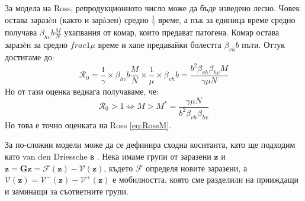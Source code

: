 За модела на Ross, репродукционното число може да бъде изведено лесно.
Човек остава заразèн (както и зарàзен) средно $\frac{1}{\gamma}$ време, а пък за единица време средно получава $\beta_{hv} b \frac{M}{N}$ ухапвания от комар, които предават патогена.
Комар остава заразèн за средно $frac{1}{\mu}$ време и хапе предавайки болестта $\beta_{vh} b$ пъти.
Оттук достигаме до:
\begin{equation}
  \mathscr{R}_0 = \frac{1}{\gamma} \times \beta_{hv} b \frac{M}{N} \times \frac{1}{\mu} \times \beta_{vh} b = \frac{b^2 \beta_{vh} \beta_{hv} M}{\gamma \mu N}
\end{equation}
Но от тази оценка веднага получаваме, че:
\begin{equation}
  \mathscr{R}_0 > 1 \iff M > M^* = \frac{\gamma \mu N}{b^2 \beta_{vh} \beta_{hv}}
\end{equation}
Но това е точно оценката на Ross \ref{eq:RossM}.


За по-сложни модели може да се дефинира сходна коснтанта, като ще подходим като van den Driessche в \cite{Driessche2002}. Нека имаме групи от заразени $\mathbf{z}$ и $\dot{\mathbf{z}} = \mathbf{G}{\mathbf{z}} = \mathscr{F}(\mathbf{z}) - \mathscr{V}(\mathbf{z})$, където $\mathscr{F}$ определя новите заразени, а $\mathscr{V}(\mathbf{z}) = \mathscr{V}^-(\mathbf{z}) - \mathscr{V}^+(\mathbf{z})$ е мобилността, която сме разделили на прииждащи и заминащи за съответните групи.

